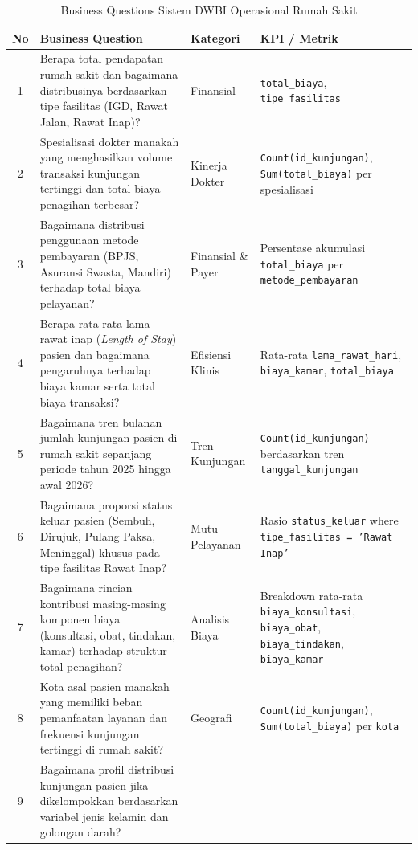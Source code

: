 \begin{table}[H]
\centering
\caption{Business Questions Sistem DWBI Operasional Rumah Sakit}
\small
\begin{tabularx}{\linewidth}{cp{5.5cm}p{2.5cm}X}
\toprule
\textbf{No} & \textbf{Business Question} & \textbf{Kategori} & \textbf{KPI / Metrik} \\
\midrule
1  & Berapa total pendapatan rumah sakit dan bagaimana distribusinya berdasarkan tipe fasilitas (IGD, Rawat Jalan, Rawat Inap)?
   & Finansial
   & \texttt{total\_biaya}, \texttt{tipe\_fasilitas} \\[3pt]
2  & Spesialisasi dokter manakah yang menghasilkan volume transaksi kunjungan tertinggi dan total biaya penagihan terbesar?
   & Kinerja Dokter
   & \texttt{Count(id\_kunjungan)}, \texttt{Sum(total\_biaya)} per spesialisasi \\[3pt]
3  & Bagaimana distribusi penggunaan metode pembayaran (BPJS, Asuransi Swasta, Mandiri) terhadap total biaya pelayanan?
   & Finansial \& Payer
   & Persentase akumulasi \texttt{total\_biaya} per \texttt{metode\_pembayaran} \\[3pt]
4  & Berapa rata-rata lama rawat inap (\textit{Length of Stay}) pasien dan bagaimana pengaruhnya terhadap biaya kamar serta total biaya transaksi?
   & Efisiensi Klinis
   & Rata-rata \texttt{lama\_rawat\_hari}, \texttt{biaya\_kamar}, \texttt{total\_biaya} \\[3pt]
5  & Bagaimana tren bulanan jumlah kunjungan pasien di rumah sakit sepanjang periode tahun 2025 hingga awal 2026?
   & Tren Kunjungan
   & \texttt{Count(id\_kunjungan)} berdasarkan tren \texttt{tanggal\_kunjungan} \\[3pt]
6  & Bagaimana proporsi status keluar pasien (Sembuh, Dirujuk, Pulang Paksa, Meninggal) khusus pada tipe fasilitas Rawat Inap?
   & Mutu Pelayanan
   & Rasio \texttt{status\_keluar} where \texttt{tipe\_fasilitas = 'Rawat Inap'} \\[3pt]
7  & Bagaimana rincian kontribusi masing-masing komponen biaya (konsultasi, obat, tindakan, kamar) terhadap struktur total penagihan?
   & Analisis Biaya
   & Breakdown rata-rata \texttt{biaya\_konsultasi}, \texttt{biaya\_obat}, \texttt{biaya\_tindakan}, \texttt{biaya\_kamar} \\[3pt]
8  & Kota asal pasien manakah yang memiliki beban pemanfaatan layanan dan frekuensi kunjungan tertinggi di rumah sakit?
   & Geografi
   & \texttt{Count(id\_kunjungan)}, \texttt{Sum(total\_biaya)} per \texttt{kota} \\[3pt]
9  & Bagaimana profil distribusi kunjungan pasien jika dikelompokkan berdasarkan variabel jenis kelamin dan golongan darah?

\end{tabularx}
\end{table}
